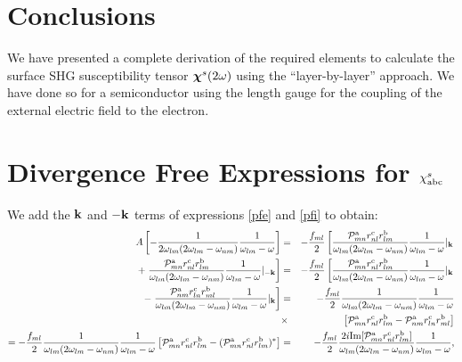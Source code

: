 \documentclass[floatfix,prb,aps,superscriptaddress,11pt,preprint]{revtex4}
\begin{document}
\section{Conclusions}\label{con}

We have presented a complete derivation of the required elements to
calculate the surface SHG susceptibility tensor $\boldsymbol{\chi}^s(2\omega)$ 
using the ``layer-by-layer'' approach. We have done so for a
semiconductor using the 
length gauge for the coupling of the external electric field to the electron. 


\appendix
\section{Divergence Free Expressions for $\chi^s_{\mathrm{a}\mathrm{b}\mathrm{c}}$}
We add the $\mathbf{k}$ and $-\mathbf{k}$ terms of expressions \eqref{pfe} and
\eqref{pfi} to obtain:
\begin{eqnarray}\label{chi1}
A
\left[
-\frac{1}{2\omega_{lm}(2\omega_{lm}-\omega_{nm})}\frac{1}{\omega_{lm}-\omega}
\right]&=&-\frac{f_{ml}}{2}
\left[
\frac{{\cal P}^{\mathrm{a}}_{mn}r^{\mathrm{c}}_{nl}r^{\mathrm{b}}_{lm}}{\omega_{lm}(2\omega_{lm}-\omega_{nm})}\frac{1}{\omega_{lm}-\omega}|_{\mathbf{k}}
\right.
\nonumber\\
+
\left.
\frac{{\cal P}^{\mathrm{a}}_{mn}r^{\mathrm{c}}_{nl}r^{\mathrm{b}}_{lm}}{\omega_{lm}(2\omega_{lm}-\omega_{nm})}\frac{1}{\omega_{lm}-\omega}|_{-\mathbf{k}}
\right]
&=&-\frac{f_{ml}}{2}
\left[
\frac{{\cal P}^{\mathrm{a}}_{mn}r^{\mathrm{c}}_{nl}r^{\mathrm{b}}_{lm}}{\omega_{lm}(2\omega_{lm}-\omega_{nm})}\frac{1}{\omega_{lm}-\omega}|_{\mathbf{k}}
\right.
\nonumber\\
-
\left.
\frac{{\cal P}^{\mathrm{a}}_{nm}r^{\mathrm{c}}_{ln}r^{\mathrm{b}}_{ml}}{\omega_{lm}(2\omega_{lm}-\omega_{nm})}\frac{1}{\omega_{lm}-\omega}|_{\mathbf{k}}
\right]
&=&-\frac{f_{ml}}{2}
\frac{1}{\omega_{lm}(2\omega_{lm}-\omega_{nm})}\frac{1}{\omega_{lm}-\omega}
\nonumber\\
&\times&
\left[
{\cal P}^{\mathrm{a}}_{mn}r^{\mathrm{c}}_{nl}r^{\mathrm{b}}_{lm}
-
{\cal P}^{\mathrm{a}}_{nm}r^{\mathrm{c}}_{ln}r^{\mathrm{b}}_{ml}
\right]
\\
=-\frac{f_{ml}}{2}
\frac{1}{\omega_{lm}(2\omega_{lm}-\omega_{nm})}\frac{1}{\omega_{lm}-\omega}
\left[
{\cal P}^{\mathrm{a}}_{mn}r^{\mathrm{c}}_{nl}r^{\mathrm{b}}_{lm}
-
({\cal P}^{\mathrm{a}}_{mn}r^{\mathrm{c}}_{nl}r^{\mathrm{b}}_{lm})^*
\right]
&=&-\frac{f_{ml}}{2}
\frac{2i\mathrm{Im}[{\cal P}^{\mathrm{a}}_{mn}r^{\mathrm{c}}_{nl}r^{\mathrm{b}}_{lm}]}{\omega_{lm}(2\omega_{lm}-\omega_{nm})}\frac{1}{\omega_{lm}-\omega}
\nonumber
,
\end{eqnarray}
\end{document}
